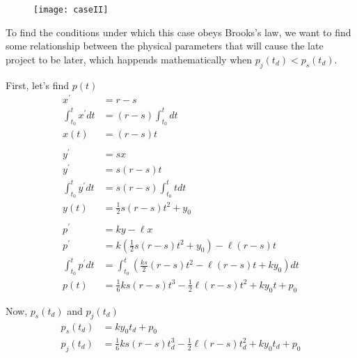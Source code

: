 \documentclass{article}
\newenvironment{atomize}
    {\begin{list} {} {
            \setlength\itemindent{0pt}
            \setlength\leftmargin{10pt}
            \setlength\labelwidth{0pt}
    }}
    {\end{list}}
\begin{document}
\begin{atomize}
\begin{atomize}
        \item 
          \begin{figure}[H]
            \centering
            \texttt{[image: caseII]}
          \end{figure}

        \item To find the conditions under which this case obeys Brooks's law,
        we want to find some relationship between the physical
        parameters that will cause the late project to be later, which
        happends mathematically when $p_{j}(t_{d}) < p_{s}(t_{d})$.

        \item First, let's find $p(t)$
          \begin{align*}
            x^{\prime} &= r - s \\[6pt]
            \int^{t}_{t_{0}} x^{\prime} dt &= (r - s)\int^{t}_{t_{0}}dt \\[6pt]
            x(t) &= (r - s)t \\[6pt]
            \\[3pt]
            y^{\prime} &= sx \\[6pt]
            y^{\prime} &= s(r - s)t \\[6pt]
            \int^{t}_{t_{0}} y^{\prime} dt &= s(r - s)\int^{t}_{t_{0}} t dt
            \\[6pt]
            y(t) &= \frac{1}{2}s(r - s)t^{2} + y_{0}\\[6pt]
            \\[3pt]
            p^{\prime} &= ky - {\ell}x \\[6pt]
            p^{\prime} &= k\left(\frac{1}{2}s(r - s)t^{2} + y_{0}\right) 
            - \ell(r - s)t \\[6pt]
            \int^{t}_{t_{0}} p^{\prime} dt &= \int^{t}_{t_{0}}
            \left(\frac{ks}{2}(r - s)t^{2} - \ell(r - s)t + ky_{0}\right)
            dt \\[6pt]
            p(t) &= \frac{1}{6}ks(r - s)t^{3} - \frac{1}{2}\ell(r - s)t^{2} 
            + ky_{0}t  + p_{0}
          \end{align*}

        \item Now, $p_{s}(t_{d})$ and $p_{j}(t_{d})$
          \begin{align*}
            p_{s}(t_{d}) &= ky_{0}t_{d}  + p_{0} \\[6pt]
            p_{j}(t_{d}) &= \frac{1}{6}ks(r - s)t_{d}^{3} 
            - \frac{1}{2}\ell(r - s)t_{d}^{2} + ky_{0}t_{d}  + p_{0}
          \end{align*}


\end{atomize}
\end{atomize}
\end{document}
